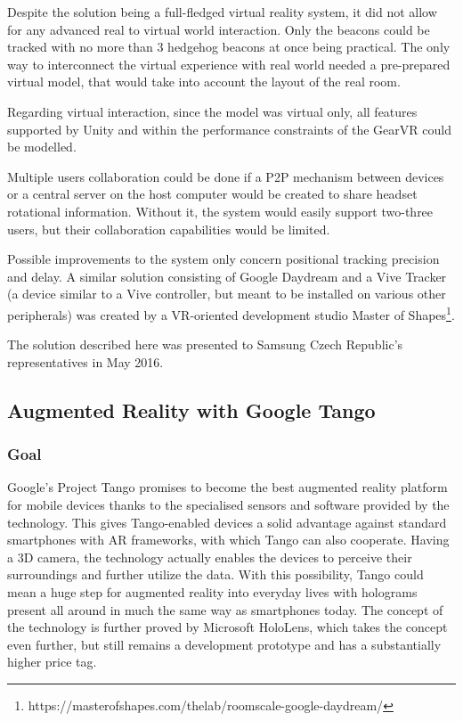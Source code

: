 \documentclass[12pt, a4paper]{article}
\begin{document}
Despite the solution being a full-fledged virtual reality system, it did not allow for any advanced real to virtual world interaction. Only the beacons could be tracked with no more than 3 hedgehog beacons at once being practical. The only way to interconnect the virtual experience with real world needed a pre-prepared virtual model, that would take into account the layout of the real room.

Regarding virtual interaction, since the model was virtual only, all features supported by Unity and within the performance constraints of the GearVR could be modelled.

Multiple users collaboration could be done if a P2P mechanism between devices or a central server on the host computer would be created to share headset rotational information. Without it, the system would easily support two-three users, but their collaboration capabilities would be limited.
	
	Possible improvements to the system only concern positional tracking precision and delay. A similar solution consisting of Google Daydream and a Vive Tracker (a device similar to a Vive controller, but meant to be installed on various other peripherals) was created by a VR-oriented development studio Master of Shapes\footnote{https://masterofshapes.com/thelab/roomscale-google-daydream/}.
	
The solution described here was presented to Samsung Czech Republic’s representatives in May 2016.

\subsection{Augmented Reality with Google Tango}
\subsubsection{Goal}
Google’s Project Tango promises to become the best augmented reality platform for mobile devices thanks to the specialised sensors and software provided by the technology. This gives Tango-enabled devices a solid advantage against standard smartphones with AR frameworks, with which Tango can also cooperate. Having a 3D camera, the technology actually enables the devices to perceive their surroundings and further utilize the data. With this possibility, Tango could mean a huge step for augmented reality into everyday lives with holograms present all around in much the same way as smartphones today. The concept of the technology is further proved by Microsoft HoloLens, which takes the concept even further, but still remains a development prototype and has a substantially higher price tag.
\end{document}
